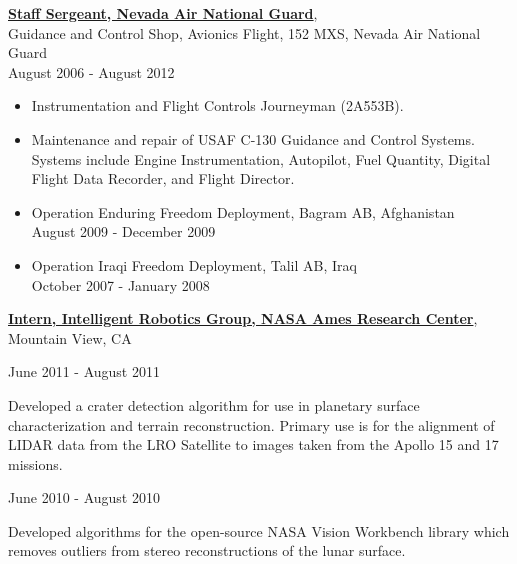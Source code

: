 \documentclass[10pt]{article}
\newenvironment{outerlist}[1][\enskip\textbullet]%
        {\begin{itemize}[#1]}{\end{itemize}%
         \vspace{-.6\baselineskip}}
\newenvironment{innerlist}[1][\enskip\textbullet]%
        {\begin{compactitem}[#1]}{\end{compactitem}}
\begin{document}
\href{http://www.nv.ngb.army.mil/air/index.cfm}
     {\textbf{Staff Sergeant, Nevada Air National Guard}},\\
     Guidance and Control Shop, Avionics Flight, 152 MXS, Nevada Air National Guard\\
     August 2006 - August 2012
     \begin{outerlist}
     \item Instrumentation and Flight Controls Journeyman (2A553B).
     \item Maintenance and repair of USAF C-130 Guidance and Control Systems. Systems
           include Engine Instrumentation, Autopilot, Fuel Quantity,
           Digital Flight Data Recorder, and Flight Director.
     \item Operation Enduring Freedom Deployment, Bagram AB, Afghanistan\\     
           August 2009 - December 2009
     \item Operation Iraqi Freedom Deployment, Talil AB, Iraq\\               
           October 2007 - January 2008\\
     \end{outerlist}

\href{http://ti.arc.nasa.gov/tech/asr/intelligent-robotics/}
     {\textbf{Intern, Intelligent Robotics Group, NASA Ames Research Center}},\\
      Mountain View, CA \hspace{48mm}
      
      \begin{outerlist}
      \item June 2011 - August 2011
         \begin{innerlist}
         \item[] Developed a crater detection algorithm for use in planetary
               surface characterization and terrain reconstruction. Primary use
               is for the alignment of LIDAR data from the LRO Satellite
               to images taken from the Apollo 15 and 17 missions.
         \end{innerlist}
      
      \item June 2010 - August 2010
      \begin{innerlist}
      \item[] Developed algorithms for the open-source NASA Vision Workbench library
            which removes outliers from stereo reconstructions of the lunar surface.\\
      \end{innerlist}
      \end{outerlist}
\end{document}
